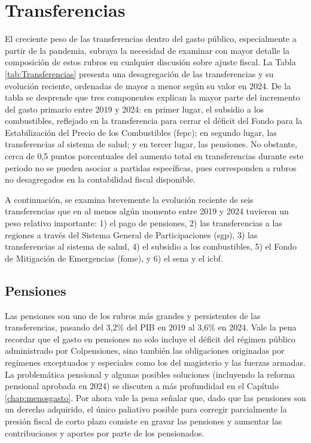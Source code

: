 \section{Transferencias}

El creciente peso de las transferencias dentro del gasto público, especialmente a partir de la pandemia, subraya la necesidad de examinar con mayor detalle la composición de estos rubros en cualquier discusión sobre ajuste fiscal. La Tabla \ref{tab:Transferencias} presenta una desagregación de las transferencias y su evolución reciente, ordenadas de mayor a menor según su valor en 2024. De la tabla se desprende que tres componentes explican la mayor parte del incremento del gasto primario entre 2019 y 2024: en primer lugar, el subsidio a los combustibles, reflejado en la transferencia para cerrar el déficit del Fondo para la Estabilización del Precio de los Combustibles (\gls{fepc}); en segundo lugar, las transferencias al sistema de salud; y en tercer lugar, las pensiones. No obstante, cerca de 0,5 puntos porcentuales del aumento total en transferencias durante este periodo no se pueden asociar a partidas específicas, pues corresponden a rubros no desagregados en la contabilidad fiscal disponible.

A continuación, se examina brevemente la evolución reciente de seis transferencias que en al menos algún momento entre 2019 y 2024 tuvieron un peso relativo importante: 1) el pago de pensiones, 2) las transferencias a las regiones a través del Sistema General de Participaciones (\gls{sgp}), 3) las transferencias al sistema de salud, 4) el subsidio a los combustibles, 5) el Fondo de Mitigación de Emergencias (\gls{fome}), y 6) el \gls{sena} y el \gls{icbf}.



\subsection{Pensiones}

Las pensiones son uno de los rubros más grandes y persistentes de las transferencias, pasando del 3,2\% del PIB en 2019 al 3,6\% en 2024. Vale la pena recordar que el gasto en pensiones no solo incluye el déficit del régimen público administrado por Colpensiones, sino también las obligaciones originadas por regímenes exceptuados y especiales como los del magisterio y las fuerzas armadas. La problemática pensional y algunas posibles soluciones (incluyendo la reforma pensional aprobada en 2024) se discuten a más profundidad en el Capítulo \ref{chap:menosgasto}. Por ahora vale la pena señalar que, dado que las pensiones son un derecho adquirido, el único paliativo posible para corregir parcialmente la presión fiscal de corto plazo consiste en gravar las pensiones y aumentar las contribuciones y aportes por parte de los pensionados.

